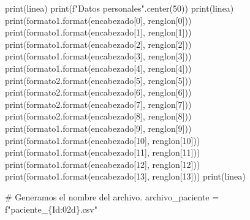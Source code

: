 \documentclass[
  spanish,
  letterpaper,
]{scrbook}
\newenvironment{Shaded}{\begin{snugshade}}{\end{snugshade}}
\newcommand{\BuiltInTok}[1]{\textcolor[rgb]{0.00,0.23,0.31}{#1}}
\newcommand{\CommentTok}[1]{\textcolor[rgb]{0.37,0.37,0.37}{#1}}
\newcommand{\DecValTok}[1]{\textcolor[rgb]{0.68,0.00,0.00}{#1}}
\newcommand{\NormalTok}[1]{\textcolor[rgb]{0.00,0.23,0.31}{#1}}
\newcommand{\OperatorTok}[1]{\textcolor[rgb]{0.37,0.37,0.37}{#1}}
\newcommand{\SpecialCharTok}[1]{\textcolor[rgb]{0.37,0.37,0.37}{#1}}
\newcommand{\SpecialStringTok}[1]{\textcolor[rgb]{0.13,0.47,0.30}{#1}}
\theoremstyle{definition}
\theoremstyle{remark}
\begin{document}
\begin{Shaded}
\begin{Highlighting}[]
\BuiltInTok{print}\NormalTok{(linea)}
\BuiltInTok{print}\NormalTok{(}\SpecialStringTok{f"Datos personales"}\NormalTok{.center(}\DecValTok{50}\NormalTok{))}
\BuiltInTok{print}\NormalTok{(linea)}
\BuiltInTok{print}\NormalTok{(formato1.}\BuiltInTok{format}\NormalTok{(encabezado[}\DecValTok{0}\NormalTok{], renglon[}\DecValTok{0}\NormalTok{]))}
\BuiltInTok{print}\NormalTok{(formato1.}\BuiltInTok{format}\NormalTok{(encabezado[}\DecValTok{1}\NormalTok{], renglon[}\DecValTok{1}\NormalTok{]))}
\BuiltInTok{print}\NormalTok{(formato1.}\BuiltInTok{format}\NormalTok{(encabezado[}\DecValTok{2}\NormalTok{], renglon[}\DecValTok{2}\NormalTok{]))}
\BuiltInTok{print}\NormalTok{(formato1.}\BuiltInTok{format}\NormalTok{(encabezado[}\DecValTok{3}\NormalTok{], renglon[}\DecValTok{3}\NormalTok{]))}
\BuiltInTok{print}\NormalTok{(formato1.}\BuiltInTok{format}\NormalTok{(encabezado[}\DecValTok{4}\NormalTok{], renglon[}\DecValTok{4}\NormalTok{]))}
\BuiltInTok{print}\NormalTok{(formato2.}\BuiltInTok{format}\NormalTok{(encabezado[}\DecValTok{5}\NormalTok{], renglon[}\DecValTok{5}\NormalTok{]))}
\BuiltInTok{print}\NormalTok{(formato2.}\BuiltInTok{format}\NormalTok{(encabezado[}\DecValTok{6}\NormalTok{], renglon[}\DecValTok{6}\NormalTok{]))}
\BuiltInTok{print}\NormalTok{(formato2.}\BuiltInTok{format}\NormalTok{(encabezado[}\DecValTok{7}\NormalTok{], renglon[}\DecValTok{7}\NormalTok{]))}
\BuiltInTok{print}\NormalTok{(formato2.}\BuiltInTok{format}\NormalTok{(encabezado[}\DecValTok{8}\NormalTok{], renglon[}\DecValTok{8}\NormalTok{]))}
\BuiltInTok{print}\NormalTok{(formato1.}\BuiltInTok{format}\NormalTok{(encabezado[}\DecValTok{9}\NormalTok{], renglon[}\DecValTok{9}\NormalTok{]))}
\BuiltInTok{print}\NormalTok{(formato1.}\BuiltInTok{format}\NormalTok{(encabezado[}\DecValTok{10}\NormalTok{], renglon[}\DecValTok{10}\NormalTok{]))}
\BuiltInTok{print}\NormalTok{(formato1.}\BuiltInTok{format}\NormalTok{(encabezado[}\DecValTok{11}\NormalTok{], renglon[}\DecValTok{11}\NormalTok{]))}
\BuiltInTok{print}\NormalTok{(formato1.}\BuiltInTok{format}\NormalTok{(encabezado[}\DecValTok{12}\NormalTok{], renglon[}\DecValTok{12}\NormalTok{]))}
\BuiltInTok{print}\NormalTok{(formato1.}\BuiltInTok{format}\NormalTok{(encabezado[}\DecValTok{13}\NormalTok{], renglon[}\DecValTok{13}\NormalTok{]))}
\BuiltInTok{print}\NormalTok{(linea)}

\CommentTok{\# Generamos el nombre del archivo.}
\NormalTok{archivo\_paciente }\OperatorTok{=} \SpecialStringTok{f"paciente\_}\SpecialCharTok{\{}\NormalTok{Id}\SpecialCharTok{:02d\}}\SpecialStringTok{.csv"}


\end{Highlighting}
\end{Shaded}
\end{document}
